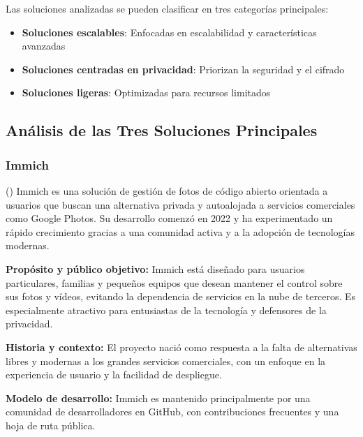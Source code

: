 Las soluciones analizadas se pueden clasificar en tres categorías principales:
\begin{itemize}
    \item \textbf{Soluciones escalables}: Enfocadas en escalabilidad y características avanzadas
    \item \textbf{Soluciones centradas en privacidad}: Priorizan la seguridad y el cifrado
    \item \textbf{Soluciones ligeras}: Optimizadas para recursos limitados
\end{itemize}

\subsection{Análisis de las Tres Soluciones Principales}

\subsubsection{Immich}

(\cite{immich-documentation}) Immich es una solución de gestión de fotos de código abierto orientada a usuarios que buscan una alternativa privada y autoalojada a servicios comerciales como Google Photos. Su desarrollo comenzó en 2022 y ha experimentado un rápido crecimiento gracias a una comunidad activa y a la adopción de tecnologías modernas.

\textbf{Propósito y público objetivo:} Immich está diseñado para usuarios particulares, familias y pequeños equipos que desean mantener el control sobre sus fotos y vídeos, evitando la dependencia de servicios en la nube de terceros. Es especialmente atractivo para entusiastas de la tecnología y defensores de la privacidad.

\textbf{Historia y contexto:} El proyecto nació como respuesta a la falta de alternativas libres y modernas a los grandes servicios comerciales, con un enfoque en la experiencia de usuario y la facilidad de despliegue.

\textbf{Modelo de desarrollo:} Immich es mantenido principalmente por una comunidad de desarrolladores en GitHub, con contribuciones frecuentes y una hoja de ruta pública.

